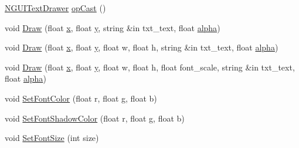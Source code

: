 \begin{DoxyCompactItemize}
\item 
\hyperlink{class_n_g_u_i_text_drawer}{N\+G\+U\+I\+Text\+Drawer} \hyperlink{class_n_g_u_i_text_drawer_a6a1a7a05be0328c9df0be9997eb7a98d}{op\+Cast} ()
\item 
void \hyperlink{class_n_g_u_i_text_drawer_a80e71bee6be505b844d9d7d09122e7b1}{Draw} (float \hyperlink{class_n_g_u_i_text_drawer_afb2395d7c0cda3aa9843a7ee1d4393cd}{x}, float \hyperlink{class_n_g_u_i_text_drawer_a72a23eb11e446ffddebadd3c10b15a23}{y}, string \&in txt\+\_\+text, float \hyperlink{class_n_g_u_i_text_drawer_a4730f4bf9cacc7e9fce124c88ef6ec87}{alpha})
\item 
void \hyperlink{class_n_g_u_i_text_drawer_a68f31eafb3765118a202066223df177b}{Draw} (float \hyperlink{class_n_g_u_i_text_drawer_afb2395d7c0cda3aa9843a7ee1d4393cd}{x}, float \hyperlink{class_n_g_u_i_text_drawer_a72a23eb11e446ffddebadd3c10b15a23}{y}, float w, float h, string \&in txt\+\_\+text, float \hyperlink{class_n_g_u_i_text_drawer_a4730f4bf9cacc7e9fce124c88ef6ec87}{alpha})
\item 
void \hyperlink{class_n_g_u_i_text_drawer_a3a65ebbdbe45bd811af16a4945503ed4}{Draw} (float \hyperlink{class_n_g_u_i_text_drawer_afb2395d7c0cda3aa9843a7ee1d4393cd}{x}, float \hyperlink{class_n_g_u_i_text_drawer_a72a23eb11e446ffddebadd3c10b15a23}{y}, float w, float h, float font\+\_\+scale, string \&in txt\+\_\+text, float \hyperlink{class_n_g_u_i_text_drawer_a4730f4bf9cacc7e9fce124c88ef6ec87}{alpha})
\item 
void \hyperlink{class_n_g_u_i_text_drawer_ac824ed4f17b947d293804b963e86fff8}{Set\+Font\+Color} (float r, float g, float b)
\item 
void \hyperlink{class_n_g_u_i_text_drawer_acfa4743716488dba8a560c569a360fc9}{Set\+Font\+Shadow\+Color} (float r, float g, float b)
\item 
void \hyperlink{class_n_g_u_i_text_drawer_a4cee05389aab41c9907e750d63133c4d}{Set\+Font\+Size} (int size)
\end{DoxyCompactItemize}
